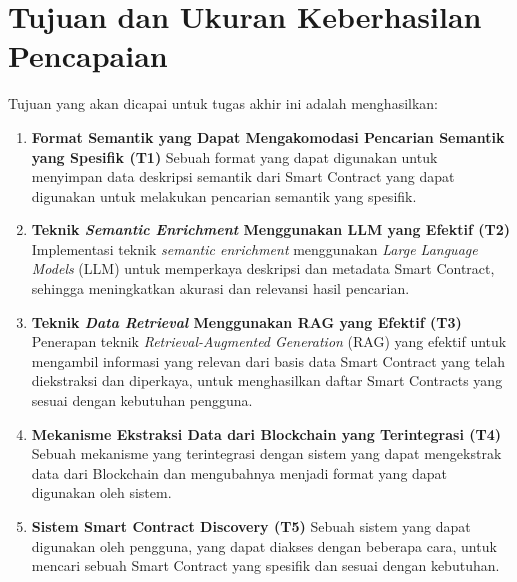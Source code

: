 \section{Tujuan dan Ukuran Keberhasilan Pencapaian}
\label{sec:tujuan-ukuran-keberhasilan-pencapaian}


Tujuan yang akan dicapai untuk tugas akhir ini adalah menghasilkan:

\begin{enumerate}
	\item \textbf{Format Semantik yang Dapat Mengakomodasi Pencarian Semantik yang Spesifik (T1)} \newline
	      Sebuah format yang dapat digunakan untuk menyimpan data deskripsi semantik dari Smart Contract yang dapat digunakan untuk melakukan pencarian semantik yang spesifik.

	\item \textbf{Teknik \textit{Semantic Enrichment} Menggunakan LLM yang Efektif (T2)} \newline
	      Implementasi teknik \textit{semantic enrichment} menggunakan \textit{Large Language Models} (LLM) untuk memperkaya deskripsi dan metadata Smart Contract, sehingga meningkatkan akurasi dan relevansi hasil pencarian.

	\item \textbf{Teknik \textit{Data Retrieval} Menggunakan RAG yang Efektif (T3)} \newline
	      Penerapan teknik \textit{Retrieval-Augmented Generation} (RAG) yang efektif untuk mengambil informasi yang relevan dari basis data Smart Contract yang telah diekstraksi dan diperkaya, untuk menghasilkan daftar Smart Contracts yang sesuai dengan kebutuhan pengguna.

	\item \textbf{Mekanisme Ekstraksi Data dari Blockchain yang Terintegrasi (T4)} \newline
	      Sebuah mekanisme yang terintegrasi dengan sistem yang dapat mengekstrak data dari Blockchain dan mengubahnya menjadi format yang dapat digunakan oleh sistem.

	\item \textbf{Sistem Smart Contract Discovery (T5)} \newline
	      Sebuah sistem yang dapat digunakan oleh pengguna, yang dapat diakses dengan beberapa cara, untuk mencari sebuah Smart Contract yang spesifik dan sesuai dengan kebutuhan.

\end{enumerate}

